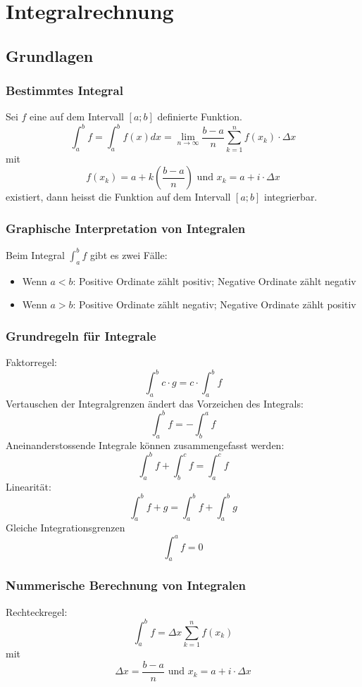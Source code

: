 \section{Integralrechnung}
\subsection{Grundlagen}
\subsubsection{Bestimmtes Integral}
Sei $f$ eine auf dem Intervall $[a;b]$ definierte Funktion.
\[ \int^b_a f = \int^b _a f(x) dx =
  \lim_{n \to \infty} \frac{b-a}{n} \sum_{k=1}^{n}f(x_k) \cdot \Delta x
\]
mit
\[ f(x_k) = a + k\left(\frac{b-a}{n}\right) \text{ und }
  x_k = a + i \cdot \Delta x\]
existiert, dann heisst die Funktion auf dem Intervall $[a;b]$
integrierbar.

\subsubsection{Graphische Interpretation von Integralen}
Beim Integral $\int_{a}^{b}f$ gibt es zwei Fälle:
\begin{itemize}
  \item Wenn $a < b$: Positive Ordinate zählt positiv;
    Negative Ordinate zählt negativ
  \item Wenn $a > b$: Positive Ordinate zählt negativ;
    Negative Ordinate zählt positiv
\end{itemize}

\subsubsection{Grundregeln für Integrale}
Faktorregel:
\[ \int_{a}^{b}c \cdot g = c \cdot \int_{a}^{b}f \]
Vertauschen der Integralgrenzen ändert das Vorzeichen des Integrals:
\[ \int_{a}^{b}f = - \int_{b}^{a}f \]
Aneinanderstossende Integrale können zusammengefasst werden:
\[ \int_{a}^{b}f + \int_{b}^{c}f = \int_{a}^{c}f \]
Linearität:
\[ \int_{a}^{b}f+g = \int_{a}^{b}f + \int_{a}^{b}g \]
Gleiche Integrationsgrenzen
\[ \int_{a}^{a} f = 0 \]

\subsubsection{Nummerische Berechnung von Integralen}
Rechteckregel:
\[ \int^b_a f =  \Delta x \sum_{k=1}^{n}f(x_k) \]
mit
\[ \Delta x = \frac{b-a}{n} \text{ und } x_k = a + i \cdot \Delta x \]

